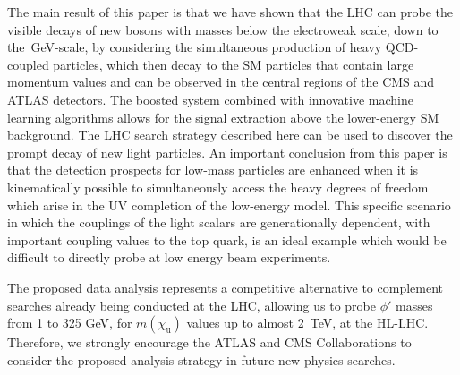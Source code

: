 The main result of this paper is that we have shown that the LHC can probe the visible decays of new bosons with masses below the electroweak scale, down to the~\textrm{GeV}-scale, by considering the simultaneous production of heavy QCD-coupled particles, which then decay to the SM particles that contain large momentum values and can be observed in the central regions of the CMS and ATLAS detectors. The boosted system combined with innovative machine learning algorithms allows for the signal extraction above the lower-energy SM background. The LHC search strategy described here can be used to discover the prompt decay of new light particles.  An important conclusion from this paper is that the detection prospects for low-mass particles are enhanced when it is kinematically possible to simultaneously access the heavy degrees of freedom which arise in the UV completion of the low-energy model.  This specific scenario in which the couplings of the light scalars are generationally dependent, with important coupling values to the top quark, is an ideal example which would be difficult to directly probe at low energy beam experiments.

The proposed data analysis represents a competitive alternative 
to complement searches already being conducted at the LHC, allowing us to probe $\phi'$ masses from 1 to 325 \textrm{GeV}, for $m(\chi_{\mathrm{u}})$ values up to almost 2~\textrm{TeV}, at the HL-LHC. Therefore, we strongly encourage the ATLAS and CMS Collaborations to consider the proposed analysis strategy in future new physics searches. 